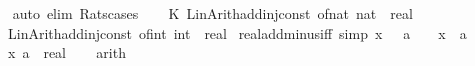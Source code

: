 \begin{isabellebody}
\ \ \isamarkupfalse%
\ {\isacharparenleft}{\kern0pt}auto\ elim{\isacharcolon}{\kern0pt}\ Rats{\isacharunderscore}{\kern0pt}cases{\isacharparenright}{\kern0pt}%
\endisatagproof
{\isafoldproof}%
%
\isadelimproof
%
\endisadelimproof
%
\isadelimdocument
%
\endisadelimdocument
%
\isatagdocument
%
\isamarkuptrue%
%
\endisatagdocument
{\isafolddocument}%
%
\isadelimdocument
%
\endisadelimdocument
%
\isadelimML
%
\endisadelimML
%
\isatagML
{}\isamarkupfalse%
\ {\isacartoucheopen}\isanewline
\ \ K\ {\isacharparenleft}{\kern0pt}Lin{\isacharunderscore}{\kern0pt}Arith{\isachardot}{\kern0pt}add{\isacharunderscore}{\kern0pt}inj{\isacharunderscore}{\kern0pt}const\ {\isacharparenleft}{\kern0pt}\isactrlconstUNDERSCOREname {\isasymopen}of{\isacharunderscore}{\kern0pt}nat{\isasymclose}{\isacharcomma}{\kern0pt}\ \isactrltyp {\isasymopen}nat\ {\isasymRightarrow}\ real{\isasymclose}{\isacharparenright}{\kern0pt}\isanewline
\ \ {\isacharhash}{\kern0pt}{\isachargreater}{\kern0pt}\ Lin{\isacharunderscore}{\kern0pt}Arith{\isachardot}{\kern0pt}add{\isacharunderscore}{\kern0pt}inj{\isacharunderscore}{\kern0pt}const\ {\isacharparenleft}{\kern0pt}\isactrlconstUNDERSCOREname {\isasymopen}of{\isacharunderscore}{\kern0pt}int{\isasymclose}{\isacharcomma}{\kern0pt}\ \isactrltyp {\isasymopen}int\ {\isasymRightarrow}\ real{\isasymclose}{\isacharparenright}{\kern0pt}{\isacharparenright}{\kern0pt}\isanewline
{\isacartoucheclose}%
\endisatagML
{\isafoldML}%
%
\isadelimML
%
\endisadelimML
%
\isadelimdocument
%
\endisadelimdocument
%
\isatagdocument
%
\isamarkuptrue%
%
\endisatagdocument
{\isafolddocument}%
%
\isadelimdocument
%
\endisadelimdocument
{}\isamarkupfalse%
\ real{\isacharunderscore}{\kern0pt}add{\isacharunderscore}{\kern0pt}minus{\isacharunderscore}{\kern0pt}iff\ {\isacharbrackleft}{\kern0pt}simp{\isacharbrackright}{\kern0pt}{\isacharcolon}{\kern0pt}\ {\isachardoublequoteopen}x\ {\isacharplus}{\kern0pt}\ {\isacharminus}{\kern0pt}\ a\ {\isacharequal}{\kern0pt}\ {}\ {\isasymlongleftrightarrow}\ x\ {\isacharequal}{\kern0pt}\ a{\isachardoublequoteclose}\isanewline
\ \ \ x\ a\ {\isacharcolon}{\kern0pt}{\isacharcolon}{\kern0pt}\ real\isanewline
%
\isadelimproof
\ \ %
\endisadelimproof
%
\isatagproof
{}\isamarkupfalse%
\ arith%
\endisatagproof
{\isafoldproof}%
%
\isadelimproof
\isanewline
%
\endisadelimproof
\isanewline
{}\isamarkupfalse%

\end{isabellebody}

